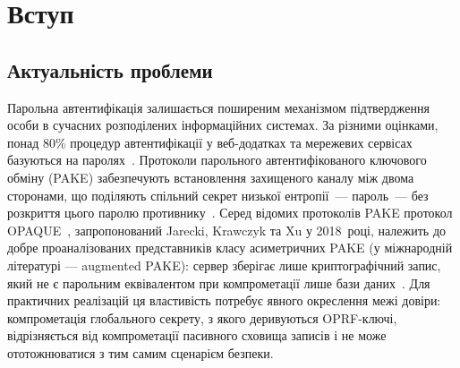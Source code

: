 \documentclass{llncs}
\begin{document}
\begin{abstract}
Реалізацію виконано мовою \textbf{Rust~1.93.1}; пакет дослідницьких
матеріалів охоплює понад 5,3~тис. рядків основного коду, майже
4,0~тис. рядків тестів і 1,46~тис. рядків еталонних вимірювань. На
платформі Apple~M1~Pro повний цикл автентифікації становить
481,43~мс, повний раунд ML-KEM-768~--- 122,01~мкс, тоді як
домінантний внесок у латентність дає Argon2id
(510,86~мс в ізольованому вимірюванні). Постквантовий шар додає
159,3~мкс процесорного часу до повного ключового обміну без KSF і
збільшує повний обсяг рукостискання до 2715~байт без зміни кількості
раундів. Порівняно з класичним OPAQUE це означає адитивне й
контрольоване зростання складності для чесних сторін і жорсткішу
умову компрометації ключового матеріалу в прийнятій моделі. Отримані
результати показують, що перехід до
постквантово-підсиленої парольної автентифікації є практично
досяжним уже нині, а головний компроміс пов'язаний передусім із
мережевим обсягом повідомлень, а не з додатковими обчисленнями.
\end{abstract}


\section{Вступ}

\subsection{Актуальність проблеми}

Парольна автентифікація залишається поширеним механізмом
підтвердження особи в сучасних розподілених інформаційних системах.
За різними оцінками, понад 80\% процедур автентифікації у веб-додатках
та мережевих сервісах базуються на паролях~\cite{bonneau2012,florencio2007}.
Протоколи парольного автентифікованого ключового обміну (PAKE)
забезпечують встановлення захищеного каналу між двома сторонами, що
поділяють спільний секрет низької ентропії~--- пароль~--- без розкриття
цього паролю противнику~\cite{bellare2000}. Серед відомих протоколів
PAKE протокол OPAQUE~\cite{jarecki2018}, запропонований Jarecki,
Krawczyk та Xu у 2018~році, належить до добре проаналізованих
представників класу асиметричних PAKE (у міжнародній літературі ---
augmented PAKE): сервер зберігає лише криптографічний запис, який не є
парольним еквівалентом при
компрометації лише бази даних~\cite{ietf-opaque}. Для практичних
реалізацій ця властивість потребує явного окреслення межі довіри:
компрометація глобального секрету, з якого деривуються OPRF-ключі,
відрізняється від компрометації пасивного сховища записів і не може
ототожнюватися з тим самим сценарієм безпеки.
\end{document}
